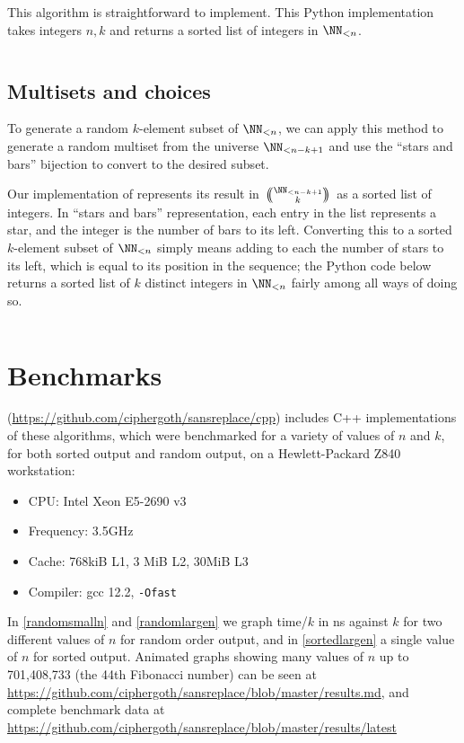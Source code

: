 \documentclass[letterpaper,luatex,11pt]{article}
\newcommand{\multichoose}[2]{
\left.\mathchoice
  {\left(\kern-0.48em\binom{#1}{#2}\kern-0.48em\right)}
  {\big(\kern-0.30em\binom{\smash{#1}}{\smash{#2}}\kern-0.30em\big)}
  {\left(\kern-0.30em\binom{\smash{#1}}{\smash{#2}}\kern-0.30em\right)}
  {\left(\kern-0.30em\binom{\smash{#1}}{\smash{#2}}\kern-0.30em\right)}
\right.}
\begin{document}
This algorithm is straightforward to implement. This Python
implementation takes integers $n, k$ and returns a sorted list of
integers in \(\NN_{<n}\).

\inputminted{Python}{code/choose_multiset.py}

\subsection{Multisets and choices}

To generate a random \(k\)-element subset of \(\NN_{<n}\), we can
apply this method to generate a random multiset from the universe
\(\NN_{<n-k + 1}\) and use the ``stars and bars'' bijection to convert
to the desired subset.

Our implementation of  represents its result
in \(\multichoose{\NN_{<n-k + 1}}{k}\) as a sorted list of integers.
In ``stars and bars'' representation, each entry in the list
represents a star, and the integer is the number of bars to its left.
Converting this to a sorted \(k\)-element subset of \(\NN_{<n}\)
simply means adding to each the number of stars to its left, which is
equal to its position in the sequence; the Python code below returns a
sorted list of $k$ distinct integers in \(\NN_{<n}\) fairly among all
ways of doing so.

\inputminted{Python}{code/choose_binom.py}

\section{Benchmarks}

(\url{https://github.com/ciphergoth/sansreplace/cpp}) includes C++
implementations of these algorithms, which were benchmarked for a
variety of values of \(n\) and \(k\), for both sorted output and
random output, on a Hewlett-Packard Z840 workstation:

\begin{itemize}
    \item CPU: Intel Xeon E5-2690 v3
    \item Frequency: 3.5GHz
    \item Cache: 768kiB L1, 3 MiB L2, 30MiB L3
    \item Compiler: gcc 12.2, \verb|-Ofast|
\end{itemize}

In \autoref{randomsmalln} and \autoref{randomlargen} we graph
time/\(k\) in ns against \(k\) for two different values of \(n\) for
random order output, and in \autoref{sortedlargen} a single value of
\(n\) for sorted output. Animated graphs showing many values of \(n\)
up to 701,408,733 (the 44th Fibonacci number) can be seen at
\url{https://github.com/ciphergoth/sansreplace/blob/master/results.md},
and complete benchmark data at
\url{https://github.com/ciphergoth/sansreplace/blob/master/results/latest}
\end{document}
